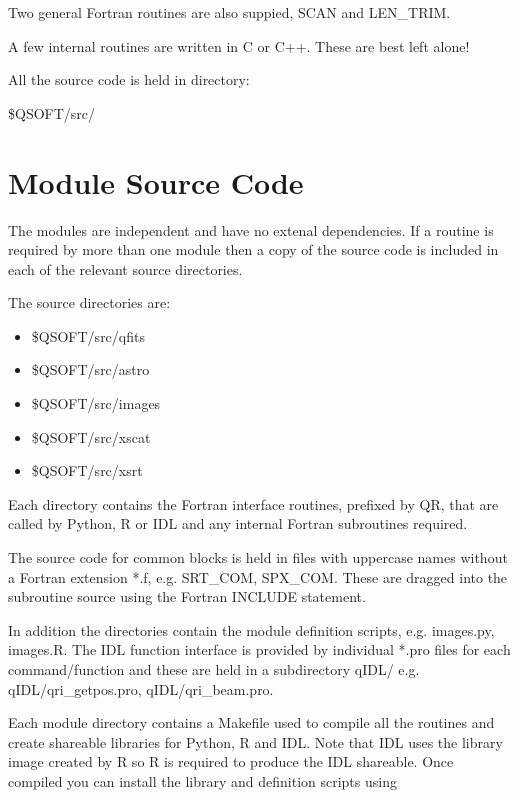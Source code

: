 \documentclass[letterpaper,10pt,english]{sphinxmanual}
\begin{document}
Two general Fortran routines are also suppied, SCAN and LEN\_TRIM.

A few internal routines are written in C or C++. These are best left alone!

All the source code is held in directory:

\$QSOFT/src/


\section{Module Source Code}
\label{\detokenize{qsoft_source_code:module-source-code}}\label{\detokenize{qsoft_source_code::doc}}
The modules are independent and have no extenal dependencies.
If a routine is required
by more than one module then a copy of the source code
is included in each of the relevant source directories.

The source directories are:
\begin{itemize}
\item {} 
\$QSOFT/src/qfits

\item {} 
\$QSOFT/src/astro

\item {} 
\$QSOFT/src/images

\item {} 
\$QSOFT/src/xscat

\item {} 
\$QSOFT/src/xsrt

\end{itemize}

Each directory contains the Fortran interface routines, prefixed by QR, that
are called by Python, R or IDL and any internal Fortran subroutines required.

The source code for common blocks is held in files with uppercase
names without a Fortran extension *.f, e.g. SRT\_COM, SPX\_COM.
These are dragged into the subroutine source using the Fortran INCLUDE
statement.

In addition the directories contain the module definition scripts, e.g.
images.py, images.R. The IDL function interface is provided by
individual *.pro files for each command/function and these are held in
a subdirectory qIDL/ e.g. qIDL/qri\_getpos.pro, qIDL/qri\_beam.pro.

Each module directory contains a Makefile used to compile all the routines
and create shareable libraries for Python, R and IDL. Note that IDL
uses the library image created by R so R is required to produce the IDL
shareable. Once compiled you can install the library and definition
scripts using
\end{document}
